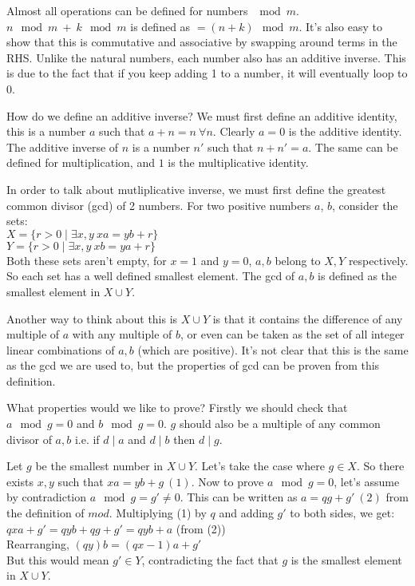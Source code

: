 \documentclass[a4paper,10pt]{article}
\theoremstyle{definition} %
\begin{document}
        Almost all operations can be defined for numbers $\mod m$. $n \mod m \ + \ k \mod m$
        is defined as $ = (n+k) \mod m$. It's also easy to show that this is commutative
        and associative by swapping around terms in the RHS. 
        Unlike the natural numbers, each number also has
        an additive inverse. This is due to the fact that if you keep adding 1 to a number,
        it will eventually loop to 0.

        How do we define an additive inverse? We must first define an additive identity,
        this is a number $a$ such that $a + n = n \ \forall n$. Clearly $a = 0$ is the 
        additive identity. The additive inverse of $n$ is a number $n'$ such that
        $n + n' = a$. The same can be defined for multiplication, and $1$ is the multiplicative identity.

        In order to talk about mutliplicative inverse, we must first define the greatest
        common divisor (gcd) of 2 numbers. For two positive numbers $a$, $b$, consider the 
        sets: \\
        $X = \{ r > 0 \mid \exists x,y \ xa = yb + r \}$ \\
        $Y = \{ r > 0 \mid \exists x,y \ xb = ya + r \}$ \\
        Both these sets aren't empty, for $x = 1$ and $y = 0$, $a, b$ belong to $X,Y$
        respectively. So each set has a well defined smallest element. The gcd of $a,b$
        is defined as the smallest element in $X \cup Y$.
        
        Another way to think about this is $X \cup Y$ is that it contains the difference
        of any multiple of $a$ with any multiple of $b$, or even can be taken as the set
        of all integer linear combinations of $a, b$ (which are positive). It's not clear that this is the 
        same as the gcd we are used to, but the properties of gcd can be proven from this 
        definition.

        What properties would we like to prove? Firstly we should check that $a \mod g = 0$
        and $b \mod g = 0$. $g$ should also be a multiple of any common divisor of $a, b$ i.e.
        if $d \mid a$ and $d \mid b$ then $d \mid g$.

        \newpage
        Let $g$ be the smallest number in $X \cup Y$. Let's take the case where $g \in X$.
        So there exists $x, y$ such that $xa = yb + g \ (1)$. Now to prove $a \mod g = 0$, let's
        assume by contradiction $a \mod g = g' \neq 0$. This can be written as $a = qg + g' \ (2)$
        from the definition of $mod$. Multiplying (1) by $q$ and adding $g'$ to both sides, we get: \\
        $qxa + g'= qyb + qg + g' = qyb + a$ (from (2)) \\
        Rearranging, $(qy)b = (qx-1)a + g'$ \\ 
        But this would mean $g' \in Y$, contradicting the fact that $g$ is the smallest element 
        in $X \cup Y$.
\end{document}
